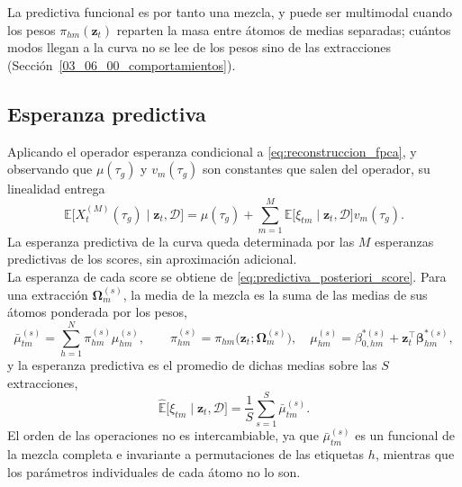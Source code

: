 La predictiva funcional es por tanto una mezcla, y puede ser multimodal cuando los pesos $\pi_{hm}(\mathbf{z}_t)$ reparten la masa entre átomos de medias separadas; cuántos modos llegan a la curva no se lee de los pesos sino de las extracciones (Sección~\ref{03_06_00_comportamientos}).

\subsection{Esperanza predictiva}
\label{03_05_01_esperanza}

Aplicando el operador esperanza condicional a \eqref{eq:reconstruccion_fpca}, y observando que $\mu(\tau_g)$ y $v_m(\tau_g)$ son constantes que salen del operador, su linealidad entrega
\begin{equation}\label{eq:esperanza_curva}
    \mathbb{E}\bigl[X_t^{(M)}(\tau_g) \mid \mathbf{z}_t, \mathcal{D}\bigr]
    = \mu(\tau_g)
    + \sum_{m=1}^{M} \mathbb{E}\bigl[\xi_{tm} \mid \mathbf{z}_t, \mathcal{D}\bigr]v_m(\tau_g).
\end{equation}
La esperanza predictiva de la curva queda determinada por las $M$ esperanzas predictivas de los scores, sin aproximación adicional.\\

La esperanza de cada score se obtiene de \eqref{eq:predictiva_posteriori_score}. Para una extracción $\boldsymbol{\Omega}_m^{(s)}$, la media de la mezcla es la suma de las medias de sus átomos ponderada por los pesos,
\begin{equation}\label{eq:momento1_iteracion}
    \bar{\mu}_{tm}^{(s)} = \sum_{h=1}^{N} \pi_{hm}^{(s)}\mu_{hm}^{(s)},
    \qquad
    \pi_{hm}^{(s)} = \pi_{hm}\bigl(\mathbf{z}_t; \boldsymbol{\Omega}_m^{(s)}\bigr),
    \quad
    \mu_{hm}^{(s)} = \beta_{0,hm}^{*(s)} + \mathbf{z}_t^\top\boldsymbol{\beta}_{hm}^{*(s)},
\end{equation}
y la esperanza predictiva es el promedio de dichas medias sobre las $S$ extracciones,
\begin{equation}\label{eq:esperanza_score_estimada}
    \widehat{\mathbb{E}}\bigl[\xi_{tm} \mid \mathbf{z}_t, \mathcal{D}\bigr]
    = \frac{1}{S}\sum_{s=1}^{S} \bar{\mu}_{tm}^{(s)}.
\end{equation}
El orden de las operaciones no es intercambiable, ya que $\bar{\mu}_{tm}^{(s)}$ es un funcional de la mezcla completa e invariante a permutaciones de las etiquetas $h$, mientras que los parámetros individuales de cada átomo no lo son.\\



